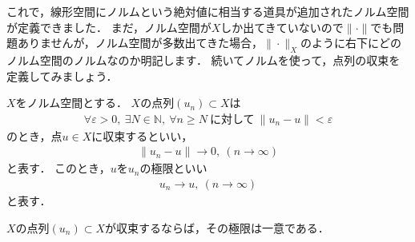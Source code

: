 これで，線形空間にノルムという絶対値に相当する道具が追加されたノルム空間が定義できました．
まだ，ノルム空間が$X$しか出てきていないので$\| \cdot \|$でも問題ありませんが，ノルム空間が多数出てきた場合，$\| \cdot \|_{X}$のように右下にどのノルム空間のノルムなのか明記します．
続いてノルムを使って，点列の収束を定義してみましょう．


\begin{defi}[ノルム空間の収束と極限]\label{def:App:Con}
$X$をノルム空間とする．
$X$の点列$(u_n) \subset X$は
\begin{align*}
	\forall \varepsilon > 0, ~ \exists N \in {\mathbb N}, ~ \forall n \ge N ~ \mbox{に対して} ~ \| u_n - u \| < \varepsilon
\end{align*}
のとき，点$u \in X$に収束するといい，
\begin{align*}
\| u_n - u \| \rightarrow 0, ~ (n \rightarrow \infty)
\end{align*}
と表す．
このとき，$u$を$u_n$の極限といい
\begin{align*}
u_n \rightarrow u, ~ (n\rightarrow \infty)
\end{align*}
と表す．
\end{defi}

\begin{Thm}[極限の一意性]\label{thm:limit_unique}
	$X$の点列$(u_n) \subset X$が収束するならば，その極限は一意である．
\end{Thm}

